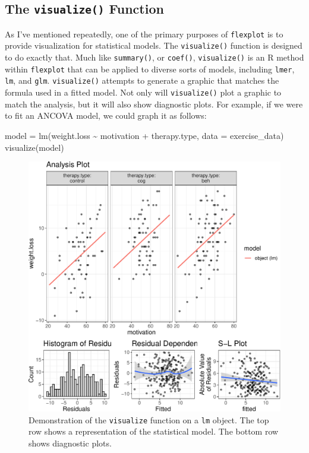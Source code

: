 \documentclass[
  english,
  man]{apa6}
\newenvironment{Shaded}{\begin{snugshade}}{\end{snugshade}}
\newcommand{\AttributeTok}[1]{\textcolor[rgb]{0.77,0.63,0.00}{#1}}
\newcommand{\FunctionTok}[1]{\textcolor[rgb]{0.00,0.00,0.00}{#1}}
\newcommand{\NormalTok}[1]{#1}
\newcommand{\OtherTok}[1]{\textcolor[rgb]{0.56,0.35,0.01}{#1}}
\newcommand{\SpecialCharTok}[1]{\textcolor[rgb]{0.00,0.00,0.00}{#1}}
\begin{document}
\hypertarget{the-visualize-function}{%
\subsection{\texorpdfstring{The \texttt{visualize()} Function}{The visualize() Function}}\label{the-visualize-function}}

As I've mentioned repeatedly, one of the primary purposes of \texttt{flexplot} is to provide visualization for statistical models. The \texttt{visualize()} function is designed to do exactly that. Much like \texttt{summary()}, or \texttt{coef()}, \texttt{visualize()} is an R method within \texttt{flexplot} that can be applied to diverse sorts of models, including \texttt{lmer}, \texttt{lm}, and \texttt{glm}. \texttt{visualize()} attempts to generate a graphic that matches the formula used in a fitted model. Not only will \texttt{visualize()} plot a graphic to match the analysis, but it will also show diagnostic plots. For example, if we were to fit an ANCOVA model, we could graph it as follows:

\small

\begin{Shaded}
\begin{Highlighting}[]
\NormalTok{model }\OtherTok{=} \FunctionTok{lm}\NormalTok{(weight.loss }\SpecialCharTok{\textasciitilde{}}\NormalTok{ motivation }\SpecialCharTok{+}\NormalTok{ therapy.type, }
           \AttributeTok{data =}\NormalTok{ exercise\_data)}
\FunctionTok{visualize}\NormalTok{(model)}
\end{Highlighting}
\end{Shaded}

\begin{figure}
\centering
\includegraphics{flexplot_psychmeth_files/figure-latex/ancova-1.pdf}
\caption{\label{fig:ancova}Demonstration of the \texttt{visualize} function on a \texttt{lm} object. The top row shows a representation of the statistical model. The bottom row shows diagnostic plots. \label{fig:ancova}}
\end{figure}
\end{document}
